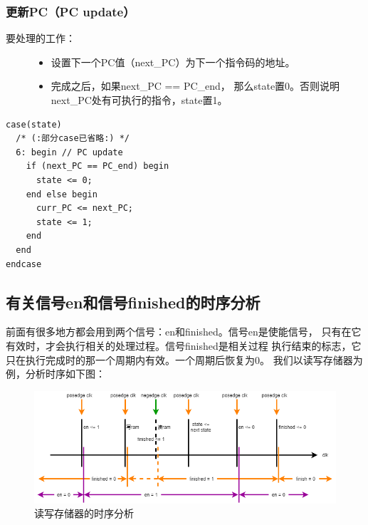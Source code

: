 \documentclass[12pt,a4paper,UTF8]{article}
\begin{document}
\subsubsection{更新PC（PC update）}
\begin{description}
  \item[要处理的工作：] \hspace*{\fill}
        \begin{itemize}
          \item 设置下一个PC值（next\_PC）为下一个指令码的地址。
          \item 完成之后，如果next\_PC == PC\_end，
                那么state置0。否则说明\linebreak[4]
                next\_PC处有可执行的指令，state置1。
        \end{itemize}
\end{description}

\begin{lstlisting}[style=verilog-style]
case(state)
  /* (:部分case已省略:) */
  6: begin // PC update
    if (next_PC == PC_end) begin
      state <= 0;
    end else begin
      curr_PC <= next_PC;
      state <= 1;
    end
  end
endcase
\end{lstlisting}

\subsection{有关信号en和信号finished的时序分析}
前面有很多地方都会用到两个信号：en和finished。信号en是使能信号，
只有在它有效时，才会执行相关的处理过程。信号finished是相关过程
执行结束的标志，它只在执行完成时的那一个周期内有效。一个周期后恢复为0。
我们以读写存储器为例，分析时序如下图：
\begin{figure}[H]
  \centering
  \includegraphics[width=1\textwidth]{ram_timing.png}
  \caption{读写存储器的时序分析}
  \label{ram_timing}
\end{figure}
\end{document}
